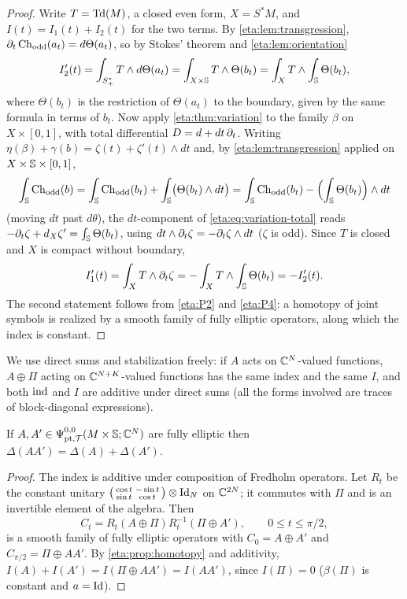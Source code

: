 \begin{proof} Write $T=\operatorname{Td}(M)$, a closed even form, $X=S^*M$, and
$I(t)=I_1(t)+I_2(t)$ for the two terms. By \cref{eta:lem:transgression},
$\partial_t\operatorname{Ch}_{\mathrm{odd}}(a_t)=d\Theta(a_t)$, so by Stokes' theorem and \cref{eta:lem:orientation}
\[
I_2'(t)=\int_{S^*_+}T\wedge d\Theta(a_t)=\int_{X\times\mathbb{S}}T\wedge\Theta(b_t)
=\int_XT\wedge\int_{\mathbb{S}}\Theta(b_t),
\]
where $\Theta(b_t)$ is the restriction of $\Theta(a_t)$ to the boundary, given by the same
formula in terms of $b_t$. Now apply \cref{eta:thm:variation} to the family $\beta$
on $X\times[0,1]$, with total differential $D=d+dt\,\partial_t$. Writing
$\eta(\beta)+\gamma(b)=\zeta(t)+\zeta'(t)\wedge dt$ and, by
\cref{eta:lem:transgression} applied on $X\times\mathbb{S}\times[0,1]$,
\[
\int_{\mathbb{S}}\operatorname{Ch}_{\mathrm{odd}}(b)=\int_{\mathbb{S}}\operatorname{Ch}_{\mathrm{odd}}(b_t)+\int_{\mathbb{S}}\bigl(\Theta(b_t)\wedge dt\bigr)
=\int_{\mathbb{S}}\operatorname{Ch}_{\mathrm{odd}}(b_t)-\Bigl(\int_{\mathbb{S}}\Theta(b_t)\Bigr)\wedge dt
\]
(moving $dt$ past $d\theta$), the $dt$-component of \eqref{eta:eq:variation-total} reads
$-\partial_t\zeta+d_X\zeta'=\int_{\mathbb{S}}\Theta(b_t)$, using $dt\wedge\partial_t\zeta=-\partial_t\zeta\wedge dt$
($\zeta$ is odd). Since $T$ is closed and $X$ is compact without boundary,
\[
I_1'(t)=\int_XT\wedge\partial_t\zeta=-\int_XT\wedge\int_{\mathbb{S}}\Theta(b_t)=-I_2'(t).
\]
The second statement follows from \ref{eta:P2} and \ref{eta:P4}: a homotopy of joint
symbols is realized by a smooth family of fully elliptic operators, along which the
index is constant.
\end{proof}

We use direct sums and stabilization freely: if $A$ acts on $\mathbb{C}^N$-valued functions,
$A\oplus\Pi$ acting on $\mathbb{C}^{N+K}$-valued functions has the same index and the same $I$,
and both $\operatorname{ind}$ and $I$ are additive under direct sums (all the forms involved are
traces of block-diagonal expressions).

\begin{lemma}\label{eta:lem:multiplicative}
If $A,A'\in\Psi^{0,0}_{\mathrm{pt},\mathcal{T}}(M\times\mathbb{S};\mathbb{C}^N)$ are fully elliptic then
$\Delta(AA')=\Delta(A)+\Delta(A')$.
\end{lemma}

\begin{proof} The index is additive under composition of Fredholm operators. Let
$R_t$ be the constant unitary $\begin{psmallmatrix}\cos t&-\sin t\\ \sin t&\cos t\end{psmallmatrix}
\otimes\operatorname{Id}_N$ on $\mathbb{C}^{2N}$; it commutes with $\Pi$ and is an invertible element of the
algebra. Then
\[
C_t=R_t(A\oplus\Pi)R_t^{-1}(\Pi\oplus A'),\qquad 0\le t\le\pi/2,
\]
is a smooth family of fully elliptic operators with $C_0=A\oplus A'$ and
$C_{\pi/2}=\Pi\oplus AA'$. By \cref{eta:prop:homotopy} and additivity,
$I(A)+I(A')=I(\Pi\oplus AA')=I(AA')$, since $I(\Pi)=0$ ($\beta(\Pi)$ is constant and
$a=\operatorname{Id}$).
\end{proof}

